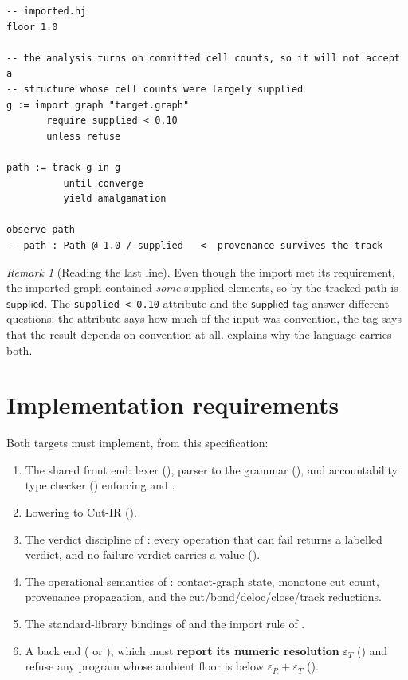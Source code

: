 \documentclass[11pt,twocolumn,a4paper]{article}
\theoremstyle{thmstyle}
\theoremstyle{definition}
\theoremstyle{remark}
\newtheorem{remark}[theorem]{Remark}
\newcommand{\hj}[1]{\texttt{#1}}
\newcommand{\supplied}{\textsf{supplied}}
\newcommand{\eps}{\varepsilon}
\begin{document}
\begin{lstlisting}[caption={A program that will not compute over
convention-heavy input.}]
-- imported.hj
floor 1.0

-- the analysis turns on committed cell counts, so it will not accept a
-- structure whose cell counts were largely supplied
g := import graph "target.graph"
       require supplied < 0.10
       unless refuse

path := track g in g
          until converge
          yield amalgamation

observe path
-- path : Path @ 1.0 / supplied   <- provenance survives the track
\end{lstlisting}

\begin{remark}[Reading the last line]
\label{rem:read-last}
Even though the import met its requirement, the imported graph contained
\emph{some} supplied elements, so by  the tracked
path is $\supplied$. The \hj{supplied < 0.10} attribute and the
$\supplied$ tag answer different questions: the attribute says how much
of the input was convention, the tag says that the result depends on
convention at all.  explains why the language
carries both.
\end{remark}

\section{Implementation requirements}
\label{sec:impl}

Both targets must implement, from this specification:

\begin{enumerate}[leftmargin=1.6em,itemsep=2pt]
\item The shared front end: lexer (), parser to the
grammar (), and accountability type checker
() enforcing  and
.
\item Lowering to Cut-IR ().
\item The verdict discipline of : every operation that
can fail returns a labelled verdict, and no failure verdict carries a
value ().
\item The operational semantics of : contact-graph state,
monotone cut count, provenance propagation, and the
cut/bond/deloc/close/track reductions.
\item The standard-library bindings of  and the import
rule of .
\item A back end ( or ), which
must \textbf{report its numeric resolution} $\eps_T$
() and refuse any program whose ambient floor is
below $\eps_R+\eps_T$ ().
\end{enumerate}
\end{document}
